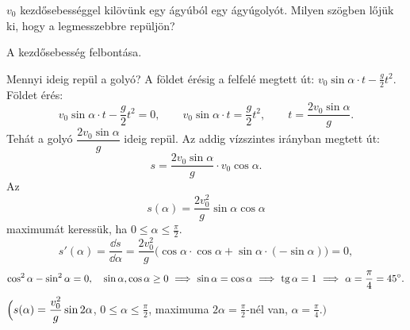 \documentclass[11pt]{article}
\begin{document}
\begin{exbox}
\begin{example}
$v_{0}$ kezdősebességgel kilövünk egy ágyúból egy ágyúgolyót. Milyen szögben lőjük ki, hogy a legmesszebbre repüljön?
\end{example}
\end{exbox}
\begin{solution}
\begin{notefig}{A kezdősebesség felbontása.}
\end{notefig}

\noindent Mennyi ideig repül a golyó? A földet érésig a felfelé megtett út: $v_{0}\sin\alpha\cdot t-\frac{g}{2}t^{2}$. Földet érés:
\[
v_{0}\sin\alpha\cdot t-\frac{g}{2}t^{2}=0,\qquad v_{0}\sin\alpha\cdot t=\frac{g}{2}t^{2},\qquad t=\frac{2v_{0}\sin\alpha}{g}.
\]
Tehát a golyó $\dfrac{2v_{0}\sin\alpha}{g}$ ideig repül. Az addig vízszintes irányban megtett út:
\[
s=\frac{2v_{0}\sin\alpha}{g}\cdot v_{0}\cos\alpha .
\]
Az
\[
s(\alpha)=\frac{2v_{0}^{2}}{g}\sin\alpha\cos\alpha
\]
maximumát keressük, ha $0\le\alpha\le\frac{\pi}{2}$.
\[
s'(\alpha)=\frac{\dd s}{\dd\alpha}=\frac{2v_{0}^{2}}{g}\bigl(\cos\alpha\cdot\cos\alpha+\sin\alpha\cdot(-\sin\alpha)\bigr)=0,
\]
\[
\cos^{2}\alpha-\sin^{2}\alpha=0,\quad \sin\alpha, \cos\alpha\ge 0
\ \Longrightarrow\ \sin\alpha=\cos\alpha\ \Longrightarrow\ \tg\alpha=1\ \Longrightarrow\ \alpha=\frac{\pi}{4}=45^{\circ}.
\]
$\Bigl(s(\alpha)=\dfrac{v_{0}^{2}}{g}\sin 2\alpha$, $0\le\alpha\le\frac{\pi}{2}$, maximuma $2\alpha=\frac{\pi}{2}$-nél van, $\alpha=\frac{\pi}{4}$.$\Bigr)$
\end{solution}
\end{document}

